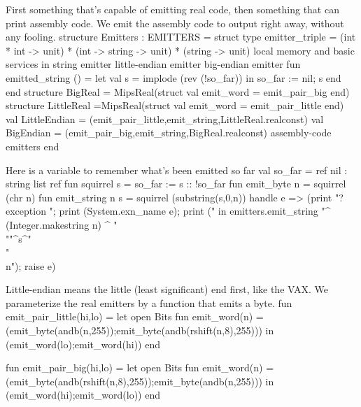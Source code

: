 \endcode
{}
First something that's capable of emitting real code, then
something that can print assembly code.
We emit the assembly code to output right away, without any fooling.
\enddocs
{}
\moddef{*}\endmoddef
structure Emitters : EMITTERS = struct
    type emitter_triple = (int * int -> unit) * (int -> string -> unit)
                                        * (string -> unit)
    local 
        \LA{}memory and basic services\RA{}
    in
        \LA{}string emitter\RA{}
        \LA{}little-endian emitter\RA{}
        \LA{}big-endian emitter\RA{}
        fun emitted_string () =
            let val s = implode (rev (!so_far))
            in  so_far := nil; s
            end
    end
    structure BigReal = MipsReal(struct val emit_word = emit_pair_big end)
    structure LittleReal =MipsReal(struct val emit_word = emit_pair_little end)
    val LittleEndian = (emit_pair_little,emit_string,LittleReal.realconst)
    val BigEndian = (emit_pair_big,emit_string,BigReal.realconst)
    \LA{}assembly-code emitters\RA{}
end


\endcode
{}
Here is a variable to remember what's been emitted so far
\enddocs
{}
\endmoddef
val so_far = ref nil : string list ref
fun squirrel s = so_far := s :: !so_far
fun emit_byte n = squirrel (chr n)
\endcode
{}
\endmoddef
fun emit_string n s = squirrel (substring(s,0,n))
                handle e =>
                        (print "?exception "; print (System.exn_name e);
                         print (" in emitters.emit_string "^
                                (Integer.makestring n) ^ " \\""^s^"\\"\\n");
                         raise e)

\endcode
{}
Little-endian means the little (least significant) end first,
like the VAX.
 We parameterize the real emitters by a function that emits a byte.
\enddocs
{}
\endmoddef
fun emit_pair_little(hi,lo) =
    let open Bits
        fun emit_word(n) =
          (emit_byte(andb(n,255));emit_byte(andb(rshift(n,8),255)))
    in  (emit_word(lo);emit_word(hi))
    end

\endcode
{}
\endmoddef
fun emit_pair_big(hi,lo) =
     let open Bits
        fun emit_word(n) =
          (emit_byte(andb(rshift(n,8),255));emit_byte(andb(n,255)))
    in  (emit_word(hi);emit_word(lo))
    end


